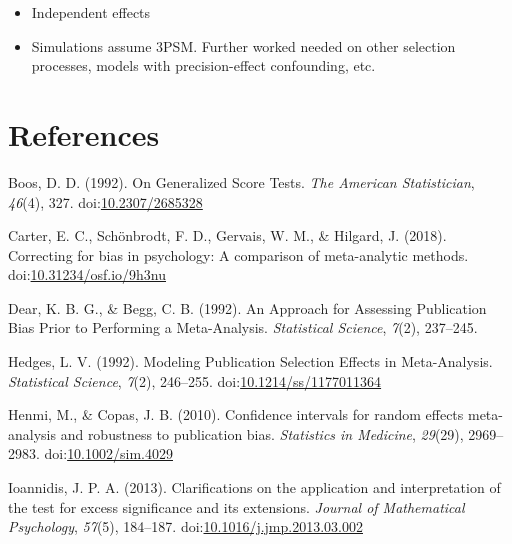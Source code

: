 \documentclass[man,floatsintext]{apa6}
\providecommand{\tightlist}{%
  \setlength{\itemsep}{0pt}\setlength{\parskip}{0pt}}
\begin{document}
\begin{itemize}
\tightlist
\item
  Independent effects
\item
  Simulations assume 3PSM. Further worked needed on other selection processes, models with precision-effect confounding, etc.
\end{itemize}

\newpage

\hypertarget{references}{%
\section{References}\label{references}}

\begingroup
\setlength{\parindent}{-0.5in}
\setlength{\leftskip}{0.5in}

\hypertarget{refs}{}
\leavevmode\hypertarget{ref-boos1992GeneralizedScoreTests}{}%
Boos, D. D. (1992). On Generalized Score Tests. \emph{The American Statistician}, \emph{46}(4), 327. doi:\href{https://doi.org/10.2307/2685328}{10.2307/2685328}

\leavevmode\hypertarget{ref-carter2018CorrectingBiasPsychology}{}%
Carter, E. C., Schönbrodt, F. D., Gervais, W. M., \& Hilgard, J. (2018). Correcting for bias in psychology: A comparison of meta-analytic methods. doi:\href{https://doi.org/10.31234/osf.io/9h3nu}{10.31234/osf.io/9h3nu}

\leavevmode\hypertarget{ref-dear1992ApproachAssessingPublication}{}%
Dear, K. B. G., \& Begg, C. B. (1992). An Approach for Assessing Publication Bias Prior to Performing a Meta-Analysis. \emph{Statistical Science}, \emph{7}(2), 237--245.

\leavevmode\hypertarget{ref-hedges1992ModelingPublicationSelection}{}%
Hedges, L. V. (1992). Modeling Publication Selection Effects in Meta-Analysis. \emph{Statistical Science}, \emph{7}(2), 246--255. doi:\href{https://doi.org/10.1214/ss/1177011364}{10.1214/ss/1177011364}

\leavevmode\hypertarget{ref-henmi2010ConfidenceIntervalsRandom}{}%
Henmi, M., \& Copas, J. B. (2010). Confidence intervals for random effects meta-analysis and robustness to publication bias. \emph{Statistics in Medicine}, \emph{29}(29), 2969--2983. doi:\href{https://doi.org/10.1002/sim.4029}{10.1002/sim.4029}

\leavevmode\hypertarget{ref-ioannidis2013ClarificationsApplicationInterpretation}{}%
Ioannidis, J. P. A. (2013). Clarifications on the application and interpretation of the test for excess significance and its extensions. \emph{Journal of Mathematical Psychology}, \emph{57}(5), 184--187. doi:\href{https://doi.org/10.1016/j.jmp.2013.03.002}{10.1016/j.jmp.2013.03.002}
\end{document}
